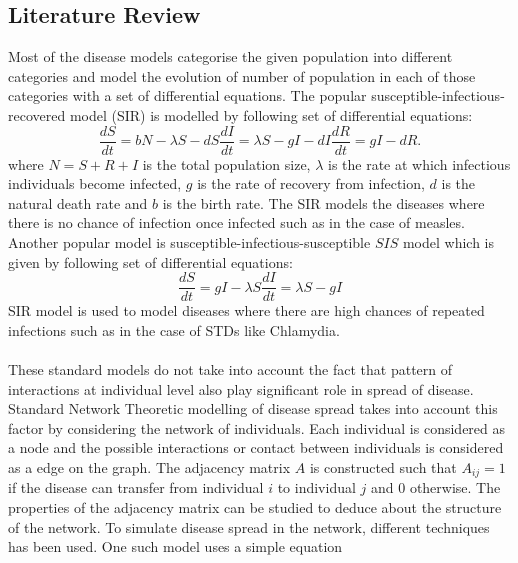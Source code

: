 \documentclass[11pt]{article}
\begin{document}
\subsection{Literature Review}
Most of the disease models categorise the given population into different categories and model the evolution of number of population in each of those categories with a set of differential equations. The popular susceptible-infectious-recovered model (SIR) is modelled by following set of differential equations:
\begin{subequations}
	\begin{equation}
		\frac{dS}{dt} = bN - \lambda S - dS
	\end{equation}
	\begin{equation}
		\frac{dI}{dt} = \lambda S - gI - dI
	\end{equation}
	\begin{equation}
		\frac{dR}{dt} = gI - dR.
	\end{equation}
\end{subequations}
where $N = S + R + I$ is the total population size, $\lambda$ is the rate at which infectious individuals become infected, $g$ is the rate of recovery from infection, $d$ is the natural death rate and $b$ is the birth rate. The SIR models the diseases where there is no chance of infection once infected such as in the case of measles. Another popular model is susceptible-infectious-susceptible $SIS$ model which is given by following set of differential equations:
\begin{subequations}
	\begin{equation}
		\frac{dS}{dt} = gI - \lambda S
	\end{equation}
	\begin{equation}
		\frac{dI}{dt} = \lambda S - gI
	\end{equation}
\end{subequations}
SIR model is used to model diseases where there are high chances of repeated infections such as in the case of STDs like Chlamydia.\\
\\
These standard models do not take into account the fact that pattern of interactions at individual level also play significant role in spread of disease. Standard Network Theoretic modelling of disease spread takes into account this factor by considering the network of individuals. Each individual is considered as a node and the possible interactions or contact between individuals is considered as a edge on the graph. The adjacency matrix $A$ is constructed such that $A_{ij} = 1$ if the disease can transfer from individual $i$ to individual $j$ and $0$ otherwise. The properties of the adjacency matrix can be studied to deduce about the structure of the network. To simulate disease spread in the network, different techniques has been used. One such model uses a simple equation
\end{document}
